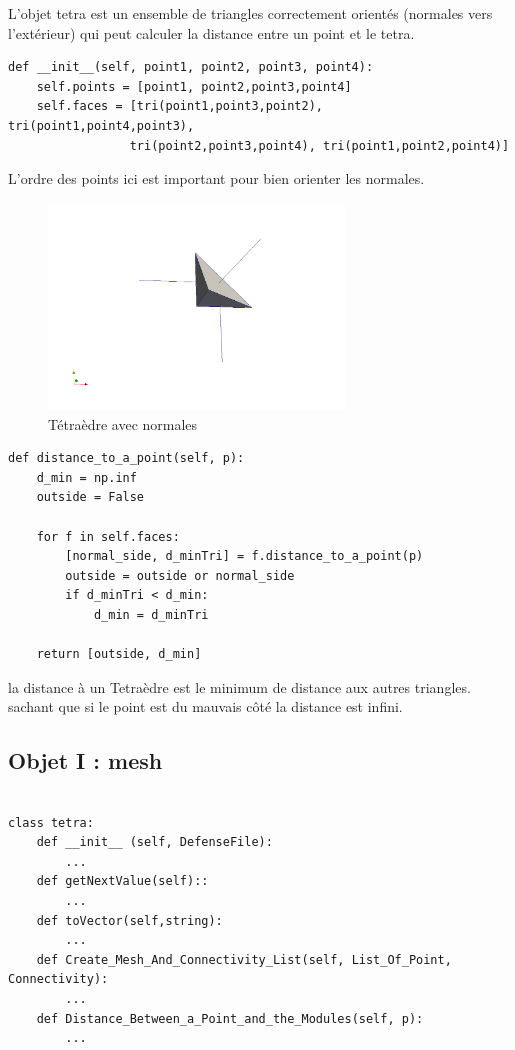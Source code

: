 \documentclass[french]{article}
\begin{document}
L'objet tetra est un ensemble de triangles correctement orientés (normales vers l'extérieur) qui peut
calculer la distance entre un point et le tetra.
\begin{verbatim}
def __init__(self, point1, point2, point3, point4):
	self.points = [point1, point2,point3,point4]
	self.faces = [tri(point1,point3,point2), tri(point1,point4,point3),
				 tri(point2,point3,point4), tri(point1,point2,point4)]
\end{verbatim}
L'ordre des points ici est important pour bien orienter les normales.
\begin{figure}[h]
	\centering
	\includegraphics[width=0.7\textwidth]{Figures/TetraNormals.png}
	\caption{Tétraèdre avec normales}
\end{figure}

\begin{verbatim}
def distance_to_a_point(self, p):
	d_min = np.inf 
	outside = False
	
	for f in self.faces:
		[normal_side, d_minTri] = f.distance_to_a_point(p)
		outside = outside or normal_side
		if d_minTri < d_min:
			d_min = d_minTri
	
	return [outside, d_min] 
\end{verbatim}
la distance à un Tetraèdre est le minimum de distance aux autres triangles. sachant que si le point
est du mauvais côté la distance est infini.

\subsection{Objet I : mesh}
\vspace{10pt}
\begin{verbatim}

class tetra:
	def __init__ (self, DefenseFile):
		...
	def getNextValue(self)::
		...
	def toVector(self,string):
		...
	def Create_Mesh_And_Connectivity_List(self, List_Of_Point, Connectivity):
		...
	def Distance_Between_a_Point_and_the_Modules(self, p):
		...

\end{verbatim}
\end{document}
